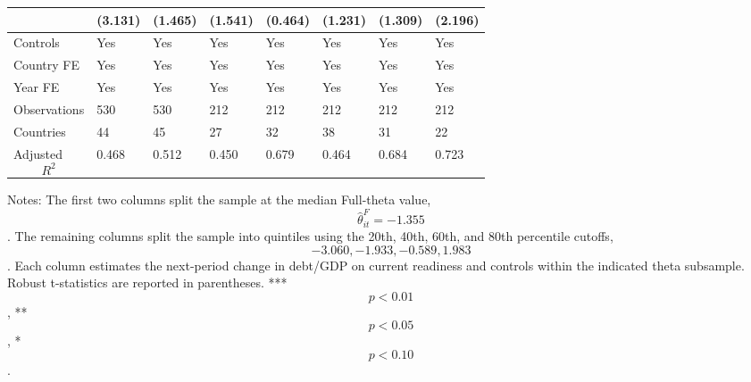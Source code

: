 \begin{table}[H]
\begin{threeparttable}
\begin{tabularx}{\textwidth}{lYYYYYYY}
  & (3.131) & (1.465) & (1.541) & (0.464) & (1.231) & (1.309) & (2.196) \\
\midrule
Controls & Yes & Yes & Yes & Yes & Yes & Yes & Yes \\
Country FE & Yes & Yes & Yes & Yes & Yes & Yes & Yes \\
Year FE & Yes & Yes & Yes & Yes & Yes & Yes & Yes \\
Observations & 530 & 530 & 212 & 212 & 212 & 212 & 212 \\
Countries & 44 & 45 & 27 & 32 & 38 & 31 & 22 \\
Adjusted $$R^2$$ & 0.468 & 0.512 & 0.450 & 0.679 & 0.464 & 0.684 & 0.723 \\
\bottomrule
\end{tabularx}
\begin{tablenotes}[flushleft]\footnotesize
\item Notes: The first two columns split the sample at the median Full-theta value, $$\widehat{\theta}^{F}_{it}=-1.355$$. The remaining columns split the sample into quintiles using the 20th, 40th, 60th, and 80th percentile cutoffs, $$-3.060, -1.933, -0.589, 1.983$$. Each column estimates the next-period change in debt/GDP on current readiness and controls within the indicated theta subsample. Robust t-statistics are reported in parentheses. *** $$p<0.01$$, ** $$p<0.05$$, * $$p<0.10$$.
\end{tablenotes}
\end{threeparttable}
\end{table}
